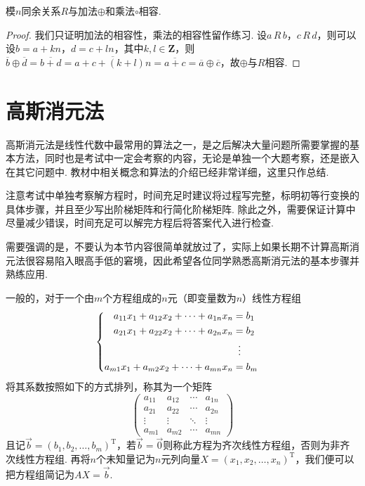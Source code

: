 \begin{theorem}{}{}
    模$n$同余关系$R$与加法$\oplus$和乘法$\circ$相容.
\end{theorem}
\begin{proof}
    我们只证明加法的相容性，乘法的相容性留作练习. 设$a\,R\,b$，$c\,R\,d$，则可以设$b=a+kn$，$d=c+ln$，其中$k,l\in\mathbf{Z}$，则$\overline{b}\oplus\overline{d}=\overline{b+d}=\overline{a+c+(k+l)n}=\overline{a+c}=\overline{a}\oplus\overline{c}$，故$\oplus$与$R$相容.
\end{proof}

\section{高斯消元法}

高斯消元法是线性代数中最常用的算法之一，是之后解决大量问题所需要掌握的基本方法，同时也是考试中一定会考察的内容，无论是单独一个大题考察，还是嵌入在其它问题中. 教材中相关概念和算法的介绍已经非常详细，这里只作总结.

注意考试中单独考察解方程时，时间充足时建议将过程写完整，标明初等行变换的具体步骤，并且至少写出阶梯矩阵和行简化阶梯矩阵. 除此之外，需要保证计算中尽量减少错误，时间充足可以解完方程后将答案代入进行检查.

需要强调的是，不要认为本节内容很简单就放过了，实际上如果长期不计算高斯消元法很容易陷入眼高手低的窘境，因此希望各位同学熟悉高斯消元法的基本步骤并熟练应用.

一般的，对于一个由$m$个方程组成的$n$元（即变量数为$n$）线性方程组
\[ \begin{cases} \begin{aligned}
            a_{11}x_1+a_{12}x_2+\cdots+a_{1n}x_n & = b_1           \\
            a_{21}x_1+a_{22}x_2+\cdots+a_{2n}x_n & = b_2           \\
                                                 & \vdotswithin{=} \\
            a_{m1}x_1+a_{m2}x_2+\cdots+a_{mn}x_n & = b_m
        \end{aligned} \end{cases} \]
将其系数按照如下的方式排列，称其为一个矩阵
\[\begin{pmatrix}
        a_{11} & a_{12} & \cdots & a_{1n} \\
        a_{21} & a_{22} & \cdots & a_{2n} \\
        \vdots & \vdots & \ddots & \vdots \\
        a_{m1} & a_{m2} & \cdots & a_{mn}
    \end{pmatrix}\]
且记$\vec{b}=(b_1,b_2,\ldots,b_m)^\mathrm{T}$，若$\vec{b}=\vec{0}$则称此方程为齐次线性方程组，否则为非齐次线性方程组. 再将$n$个未知量记为$n$元列向量$X=(x_1,x_2,\ldots,x_n)^\mathrm{T}$，我们便可以把方程组简记为$AX=\vec{b}$.


